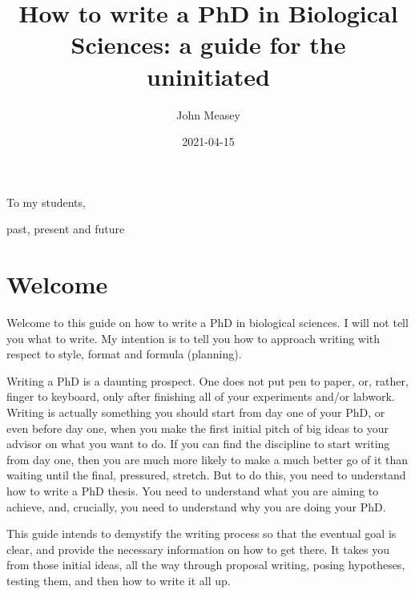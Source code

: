 \documentclass[
]{krantz}
\title{How to write a PhD in Biological Sciences: a guide for the uninitiated}
\author{John Measey}
\date{2021-04-15}
\begin{document}
\maketitle


\thispagestyle{empty}

\begin{center}
To my students,

past, present and future
\end{center}

\setlength{\abovedisplayskip}{-5pt}
\setlength{\abovedisplayshortskip}{-5pt}

{
\hypersetup{linkcolor=}
\setcounter{tocdepth}{2}
\tableofcontents
}
\listoftables
\listoffigures
\hypertarget{welcome}{%
\chapter*{Welcome}\label{welcome}}


Welcome to this guide on how to write a PhD in biological sciences. I will not tell you what to write. My intention is to tell you how to approach writing with respect to style, format and formula (planning).

Writing a PhD is a daunting prospect. One does not put pen to paper, or, rather, finger to keyboard, only after finishing all of your experiments and/or labwork. Writing is actually something you should start from day one of your PhD, or even before day one, when you make the first initial pitch of big ideas to your advisor on what you want to do. If you can find the discipline to start writing from day one, then you are much more likely to make a much better go of it than waiting until the final, pressured, stretch. But to do this, you need to understand how to write a PhD thesis. You need to understand what you are aiming to achieve, and, crucially, you need to understand why you are doing your PhD.

This guide intends to demystify the writing process so that the eventual goal is clear, and provide the necessary information on how to get there. It takes you from those initial ideas, all the way through proposal writing, posing hypotheses, testing them, and then how to write it all up.
\end{document}
